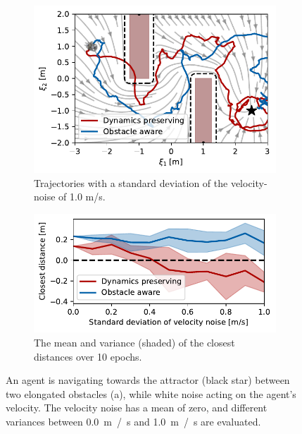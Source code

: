 \begin{figure}
    \centering
    \begin{subfigure}{\columnwidth}
      \centerline{\includegraphics[width=\textwidth]{figures/trajectory_velocity_noise}}
      \caption{Trajectories with a standard deviation of the velocity-noise of 1.0 m/s.}
      \label{fig:trajectory_velocity_noise}
    \end{subfigure}
    \begin{subfigure}{\columnwidth}
    \includegraphics[width=\textwidth]{figures/comparison_velocity_noise}
      \caption{The mean and variance (shaded) of the closest distances over 10 epochs.}
      \label{fig:comparison_velocity_noise}
    \end{subfigure}
	\caption{An agent is navigating towards the attractor (black star) between two elongated obstacles (a), while white noise acting on the agent's velocity. The velocity noise has a mean of zero, and different variances between \qty{0.0}{m / s} and \qty{1.0}{m / s} are evaluated.}
\label{fig:velocity_noise}
\end{figure}

